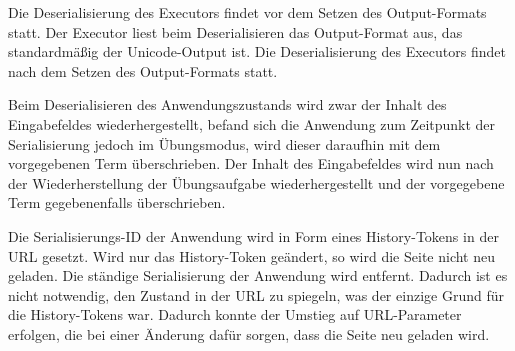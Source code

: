 \documentclass[parskip=full,11pt,openany]{scrreprt}
\begin{document}
\begin{itemize}[itemsep=3ex]
	{Die Deserialisierung des Executors findet vor dem Setzen des Output-Formats statt. Der Executor liest beim Deserialisieren das Output-Format aus, das standardmäßig der Unicode-Output ist.}
	{Die Deserialisierung des Executors findet nach dem Setzen des Output-Formats statt.}
	
	{Beim Deserialisieren des Anwendungszustands wird zwar der Inhalt des Eingabefeldes wiederhergestellt, befand sich die Anwendung zum Zeitpunkt der Serialisierung jedoch im Übungsmodus, wird dieser daraufhin mit dem vorgegebenen Term 			überschrieben.}
	{Der Inhalt des Eingabefeldes wird nun nach der Wiederherstellung der Übungsaufgabe wiederhergestellt und der vorgegebene Term gegebenenfalls überschrieben.}
	
	{Die Serialisierungs-ID der Anwendung wird in Form eines History-Tokens in der URL gesetzt. Wird nur das History-Token geändert, so wird die Seite nicht neu geladen.}
	{Die ständige Serialisierung der Anwendung wird entfernt. Dadurch ist es nicht notwendig, den Zustand in der URL zu spiegeln, was der einzige Grund für die History-Tokens war.
	Dadurch konnte der Umstieg auf URL-Parameter erfolgen, die bei einer Änderung dafür sorgen, dass die Seite neu geladen wird.}
\end{itemize}
\end{document}
